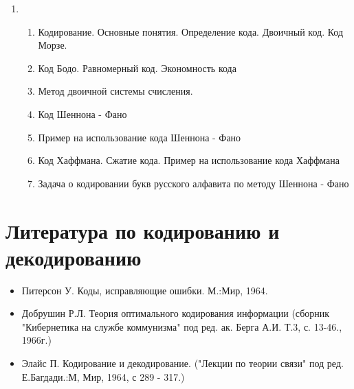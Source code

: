 ﻿\documentclass[a4paper,12pt]{report}
\begin{document}
\begin{enumerate}
	\item	\begin{enumerate}
		\item	Кодирование. Основные понятия. Определение кода. Двоичный код. Код Морзе.
		\item	Код Бодо. Равномерный код. Экономность кода
		\item	Метод двоичной системы счисления. 
		\item	Код Шеннона - Фано
		\item	Пример на использование кода Шеннона - Фано
		\item	Код Хаффмана. Сжатие кода. Пример на использование кода Хаффмана
		\item	Задача о кодировании букв русского алфавита по методу Шеннона - Фано
		\end{enumerate}		
	\end{enumerate}		
		
	
	
	\pagebreak

	\section{Литература по кодированию и декодированию}
	
	
	\begin{itemize}
	
	\item	Питерсон У. Коды, исправляющие ошибки. М.:Мир, 1964.
	\item	Добрушин Р.Л. Теория оптимального кодирования информации (сборник "Кибернетика на службе коммунизма" под ред. ак. Берга А.И. Т.3, с. 13-46., 1966г.)
	\item	Элайс П. Кодирование и декодирование. ("Лекции по теории связи" под ред. Е.Багдади.:М, Мир, 1964, с 289 - 317.)
	
	\end{itemize}
\end{document}
